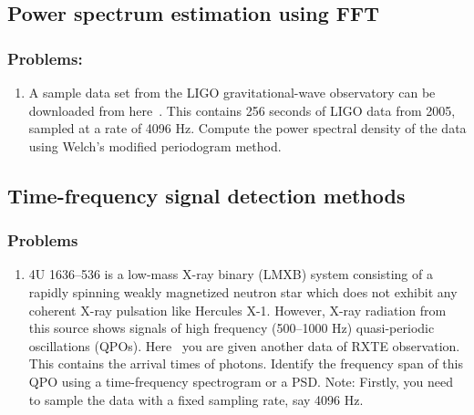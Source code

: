 \subsection{Power spectrum estimation using FFT}
\subsubsection{Problems:}
\begin{enumerate}
\item A sample data set from the LIGO gravitational-wave observatory can be downloaded from here~\cite{ligo-data}. This contains 256 seconds of LIGO data from 2005, sampled at a rate of 4096 Hz. Compute the power spectral density of the data using Welch's modified periodogram method. 
\end{enumerate}

\subsection{Time-frequency signal detection methods}
\subsubsection{Problems}
\begin{enumerate}
\item 4U 1636--536 is a low-mass X-ray binary (LMXB) system consisting of a rapidly spinning weakly magnetized neutron star which does not exhibit any coherent X-ray pulsation like Hercules X-1. However, X-ray radiation from this source shows signals of high frequency (500--1000 Hz) quasi-periodic oscillations (QPOs). Here~\cite{rxte-data2} you are given another data of RXTE observation. This contains the arrival times of photons. Identify the frequency span of this QPO using a time-frequency spectrogram or a PSD. {Note: Firstly, you need to sample the data with a fixed sampling rate, say 4096 Hz}.  
\end{enumerate}

